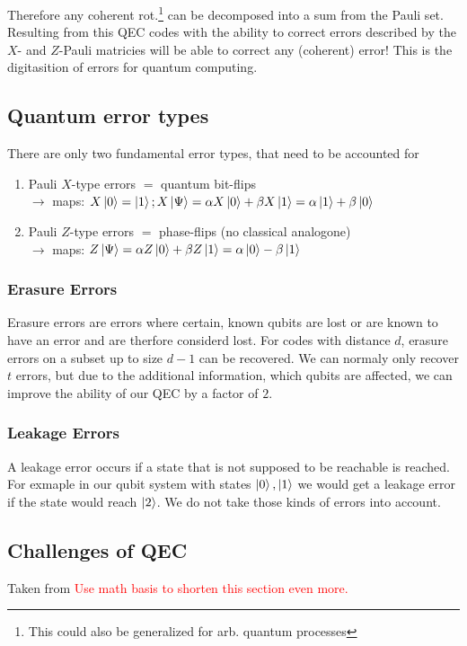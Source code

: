 Therefore any coherent rot.\footnote{This could also be generalized for arb. quantum processes} can be decomposed into a sum from the Pauli set. 
Resulting from this QEC codes with the ability to correct errors described by the $X$- and $Z$-Pauli matricies will be able to correct any (coherent) error!
This is the digitasition of errors for quantum computing. \cite{QECintro}


\subsection{Quantum error types}
There are only two fundamental error types, that need to be accounted for \cite{QECintro}

\begin{enumerate}
    \item Pauli $X$-type errors $=$ quantum bit-flips \\
    $\rightarrow$ maps: $X\ket{0} = \ket{1}; X \ket{\Psi}= \alpha X \ket{0} + \beta X \ket{1} = \alpha  \ket{1} + \beta \ket{0}   $
    \item Pauli $Z$-type errors $=$ phase-flips (no classical analogone)\\
    $\rightarrow$ maps:  $Z \ket{\Psi}= \alpha Z \ket{0} + \beta Z \ket{1} = \alpha  \ket{0} - \beta \ket{1}   $
\end{enumerate}


\subsubsection{Erasure Errors}
Erasure errors are errors where certain, known qubits are lost or are known to have an error and are therfore considerd lost. 
For codes with distance $d$, erasure errors on a subset up to size $d-1$ can be recovered. 
We can normaly only recover $t$ errors, but due to the additional information, which qubits are affected, we can improve the ability of our QEC by a factor of $2$. \cite{QECmemory}


\subsubsection{Leakage Errors}
A leakage error occurs if a state that is not supposed to be reachable is reached. 
For exmaple in our qubit system with states $\ket{0},\ket{1}$ we would get a leakage error if the state would reach $\ket{2}$.
We do not take those kinds of errors into account.


\subsection{Challenges of QEC}
Taken from \cite{QECintro}
\textcolor{red}{Use math basis to shorten this section even more.}


